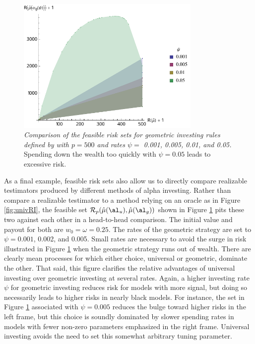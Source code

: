 \documentclass[12pt]{article}
\begin{document}
\begin{figure}
 \caption{ \label{fig:univGeo} {\sl Comparison of the feasible risk sets for
 geometric investing rules defined by  with $p=500$ and rates
 $\psi=$ 0.001, 0.005, 0.01, and 0.05.}  Spending down the wealth too quickly
 with $\psi=0.05$ leads to excessive risk.  }

 \vspace{0.1in}
 \centerline{
   \includegraphics[width=3.5in]{figures/geom}     }
 \vspace{0.2in}
\end{figure}


 As a final example, feasible risk sets also allow us to directly compare
 realizable testimators produced by different methods of alpha investing.
  Rather than compare a realizable testimator to a method relying on an oracle
 as in Figure \ref{fig:univRI}, the feasible set ${\cal R}_p (\hat\mu(\al_u),
 \hat\mu(\al_g))$ shown in Figure \ref{fig:univGeo} pits these two against each
 other in a head-to-head comparison.  The initial value and payout for both are
 $w_0 = \omega = 0.25$.  The rates of the geometric strategy are set to
 $\psi=0.001$, 0.002, and 0.005.  Small rates are necessary to avoid the surge
 in risk illustrated in Figure \ref{fig:univGeo} when the geometric strategy runs
 out of wealth.  There are clearly mean processes for which either choice,
 universal or geometric, dominate the other.  That said, this figure clarifies
 the relative advantages of universal investing over geometric investing at
 several rates.  Again, a higher investing rate $\psi$ for geometric investing
 reduces risk for models with more signal, but doing so necessarily leads to
 higher risks in nearly black models.  For instance, the set in Figure
 \ref{fig:univGeo} associated with $\psi = 0.005$ reduces the bulge toward higher
 risks in the left frame, but this choice is soundly dominated by slower
 spending rates in models with fewer non-zero parameters emphasized in the right
 frame.  Universal investing avoids the need to set this somewhat arbitrary
 tuning parameter.
\end{document}
